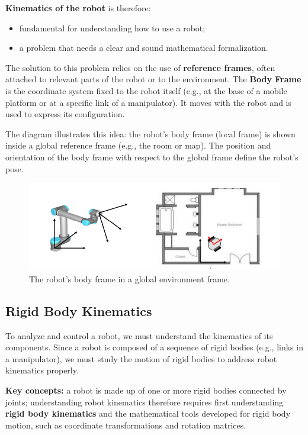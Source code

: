 \textbf{Kinematics of the robot} is therefore:
\begin{itemize}
  \item fundamental for understanding how to use a robot;
  \item a problem that needs a clear and sound mathematical formalization.
\end{itemize}

The solution to this problem relies on the use of \textbf{reference frames}, often attached to relevant parts of the robot or to the environment. The \textbf{Body Frame} is the coordinate system fixed to the robot itself (e.g., at the base of a mobile platform or at a specific link of a manipulator). It moves with the robot and is used to express its configuration.

The diagram illustrates this idea: the robot's body frame (local frame) is shown inside a global reference frame (e.g., the room or map). The position and orientation of the body frame with respect to the global frame define the robot's pose.

\begin{figure}[H]
  \centering
  \includegraphics[width=\linewidth]{imgs/part_of_interest_kinematics.png}
  \caption{The robot’s body frame in a global environment frame.}
\end{figure}

\hfill

\subsection{Rigid Body Kinematics}

To analyze and control a robot, we must understand the kinematics of its components. Since a robot is composed of a sequence of rigid bodies (e.g., links in a manipulator), we must study the motion of rigid bodies to address robot kinematics properly.

\textbf{Key concepts:} a robot is made up of one or more rigid bodies connected by joints; understanding robot kinematics therefore requires first understanding \textbf{rigid body kinematics} and the mathematical tools developed for rigid body motion, such as coordinate transformations and rotation matrices.

